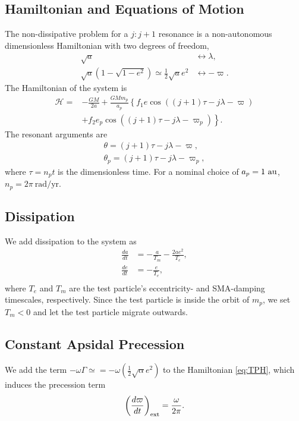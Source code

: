 \documentclass[usenatbib,twocolumn]{mnras}
\begin{document}
\subsection{Hamiltonian and Equations of Motion}
The non-dissipative problem for a $j:j+1$ resonance is a non-autonomous dimensionless Hamiltonian with two degrees of freedom,
\begin{align}
    \sqrt{a} &\longleftrightarrow \lambda,\\
    \sqrt{a}(1-\sqrt{1-e^2})\simeq \frac12\sqrt{a}e^2&\longleftrightarrow -\varpi.
\end{align}
The Hamiltonian of the system is 
\begin{align}
    \label{eq:TPH}
    \mathcal H=&-\frac{GM}{2a}
    +\frac{GMm_p}{a_p}\left\{
        f_1e\cos((j+1)\tau-j\lambda-\varpi)\right.\\
        &\left. +f_2e_p\cos((j+1)\tau-j\lambda-\varpi_p)
    \right\}.\nonumber
\end{align}
The resonant arguments are 
\begin{align}
    \theta=(j+1)\tau -j\lambda-\varpi,\\
    \theta_p=(j+1)\tau -j\lambda-\varpi_p,
\end{align}
where $\tau=n_p t$ is the dimensionless time. For a nominal choice of $a_p=1~\rm{au}$, $n_p = 2\pi~\mathrm{rad}/\mathrm{yr}$.

\subsection{Dissipation}
We add dissipation to the system as
\begin{align}
 \frac{da}{dt}&=- \frac{a}{T_{m}} - \frac{2 a e^{2}}{T_{e}},\\
 \frac{de}{dt}&=- \frac{e}{T_{e}},\\
\end{align}
where $T_e$ and $T_m$ are the test particle's eccentricity- and SMA-damping timescales, respectively. Since the test particle is inside the orbit of $m_p$, we set $T_m<0$ and let the test particle migrate outwards.


\subsection{Constant Apsidal Precession}
\label{sec:}
We add the term $-\omega\Gamma\simeq = -\omega\left(\frac12\sqrt{\alpha}e^2\right)$ to the Hamiltonian \ref{eq:TPH}, which induces the precession term
\begin{equation}
    \left(\frac{d\varpi}{dt}\right)_{\rm ext} = \frac{\omega}{2\pi}.
\end{equation}
\end{document}
